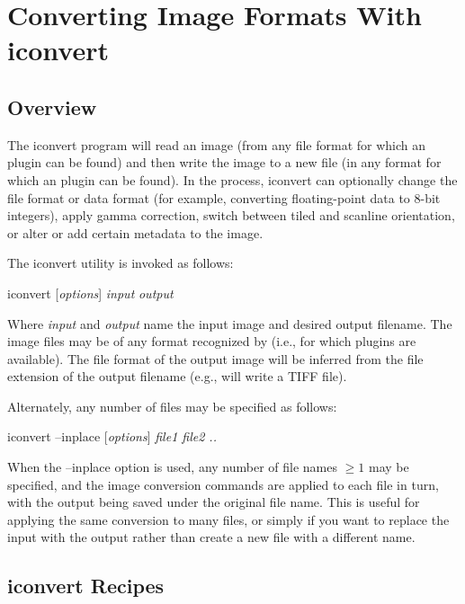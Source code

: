 \chapter{Converting Image Formats With {\kw iconvert}}
\label{chap:iconvert}

\section{Overview}

The {\cf iconvert} program will read an image (from any file format for
which an \ImageInput plugin can be found) and then write the image to a
new file (in any format for which an \ImageOutput plugin can be found).
In the process, {\cf iconvert} can optionally change the file format or
data format (for example, converting floating-point data to 8-bit
integers), apply gamma correction, switch between tiled and scanline
orientation, or alter or add certain metadata to the image.

The {\cf iconvert} utility is invoked as follows:

\medskip

\hspace{0.25in} {\cf iconvert} [\emph{options}] \emph{input} \emph{output}

\medskip

Where \emph{input} and \emph{output} name the input image and desired
output filename.  The image files may be of any format recognized by
\product (i.e., for which \ImageInput plugins are available).  The file
format of the output image will be inferred from the file extension of
the output filename (e.g.,  will write a TIFF file).

Alternately, any number of files may be specified as follows:

\medskip

\hspace{0.25in} {\cf iconvert --inplace} [\emph{options}] \emph{file1 file2 ..}

\medskip

When the {\cf --inplace} option is used, any number of file names $\ge
1$ may be specified, and the image conversion commands are applied to
each file in turn, with the output being saved under the original file
name.  This is useful for applying the same conversion to many files,
or simply if you want to replace the input with the output rather than
create a new file with a different name.

\section{{\cf iconvert} Recipes}


